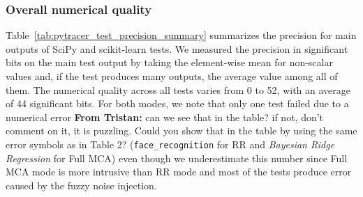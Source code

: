 \documentclass[11pt]{article}
\newcommand{\tristan}[1]{\color{orange}\textbf{From Tristan:} #1\color{black}\xspace}
\begin{document}
\subsubsection{Overall numerical quality}

Table~\ref{tab:pytracer_test_precision_summary} summarizes the precision for main outputs of SciPy and scikit-learn tests. 
We measured the precision in significant bits on the main test output by taking the element-wise mean for non-scalar values and, if the test produces many outputs, the average value among all of them. The numerical quality across all tests varies from 0 to 52, with an average of 44 significant bits. For both modes, we note that only one test failed due to a numerical error \tristan{can we see that in the table? if not, don't comment on it, it is puzzling. Could you show that in the table by using the same error symbols as in Table 2?} (\texttt{face\_recognition} for RR and \textit{Bayesian Ridge Regression} for Full MCA) even though we underestimate this number since Full MCA mode is more intrusive than RR mode and most of the tests produce error caused by the fuzzy noise injection. 
\end{document}
